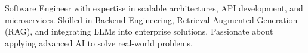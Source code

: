 

\begin{cvparagraph}



Software Engineer with expertise in scalable architectures, API development, and microservices.
Skilled in Backend Engineering, Retrieval-Augmented Generation (RAG), and integrating LLMs into enterprise solutions.
Passionate about applying advanced AI to solve real-world problems.
\end{cvparagraph}






